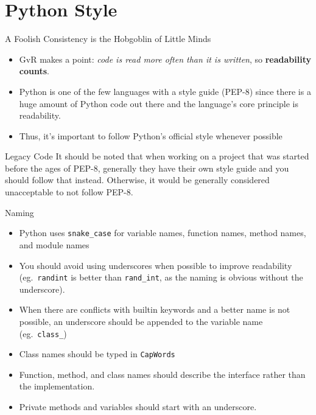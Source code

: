 \documentclass{lug}
\begin{document}
\section{Python Style}

\begin{frame}{A Foolish Consistency is the Hobgoblin of Little Minds}
    \begin{itemize}[<+->]
        \item GvR makes a point: \emph{code is read more often than it is
            written}, so \textbf{readability counts}.
        \item Python is one of the few languages with a style guide (PEP-8)
            since there is a huge amount of Python code out there and the
            language's core principle is readability.
        \item Thus, it's important to follow Python's official style whenever
            possible
    \end{itemize}
    \pause[\thebeamerpauses]
    \begin{block}{Legacy Code}
        \small
        It should be noted that when working on a project that was started
        before the ages of PEP-8, generally they have their own style guide and
        you should follow that instead.  Otherwise, it would be generally
        considered unacceptable to not follow PEP-8.
    \end{block}
\end{frame}

\begin{frame}{Naming}
    \begin{itemize}[<+->]
        \item Python uses \texttt{snake\_case} for variable names, function
            names, method names, and module names
        \item You should avoid using underscores when possible to improve
            readability (eg.\ \texttt{randint} is better than
            \texttt{rand\_int}, as the naming is obvious without the
            underscore).
        \item When there are conflicts with builtin keywords and a better name
            is not possible, an underscore should be appended to the variable
            name (eg.\ \texttt{class\_})
        \item Class names should be typed in \texttt{CapWords}
        \item Function, method, and class names should describe the
            interface rather than the implementation.
        \item Private methods and variables should start with an underscore.
    \end{itemize}
\end{frame}
\end{document}
